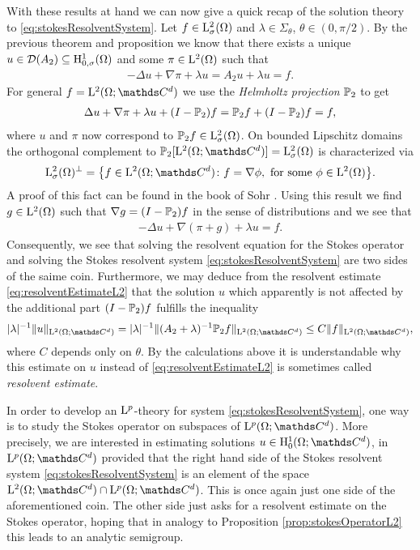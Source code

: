 With these results at hand we can now give a quick recap of the solution theory to \eqref{eq:stokesResolventSystem}.
Let $f \in \mathrm{L}^2_\sigma(\Omega)$ and $\lambda \in \Sigma_\theta$, $\theta \in (0, \pi/2)$.
By the previous theorem and proposition we know that there exists a unique $u \in \mathcal{D}(A_2) \subseteq \mathrm{H}^1_{0,\sigma}(\Omega)$ and some $\pi \in \mathrm{L}^2(\Omega)$ such that
\begin{align*}
  -\Delta u + \nabla \pi + \lambda u = A_2 u + \lambda u = f.
\end{align*}
For general $f = \Ell^2(\Omega; \C^d)$ we use the \emph{Helmholtz projection} $\mathbb{P}_2$ to get
\begin{align*}
  \Delta u + \nabla \pi + \lambda u + (I - \mathbb{P}_2) f = \mathbb{P}_2 f + (I - \mathbb{P}_2) f = f,
\end{align*}
where $u$ and $\pi$ now correspond to $\mathbb{P}_2 f \in \mathrm{L}^2_\sigma(\Omega)$. On bounded Lipschitz domains the orthogonal complement to $\PP_2[\Ell^2(\Omega; \C^d)] = \Ell^2_\sigma(\Omega)$ is characterized via
\begin{align*}
  \Ell^2_\sigma(\Omega)^\perp = \big\{ f \in \Ell^2(\Omega; \C^d) \colon f = \nabla \phi, \text{ for some } \phi \in \Ell^2(\Omega) \big\}.
\end{align*}
A proof of this fact can be found in the book of Sohr \cite[Lemma 2.5.3]{sohr}.
Using this result we find $g \in \mathrm{L}^2(\Omega)$ such that $\nabla g = (I - \mathbb{P}_2)f$ in the sense of distributions and we see that
\begin{align*}
  -\Delta u + \nabla( \pi + g ) + \lambda u = f.
\end{align*}
Consequently, we see that solving the resolvent equation for the Stokes operator and solving the Stokes resolvent system \eqref{eq:stokesResolventSystem} are two sides of the saime coin.
Furthermore, we may deduce from the resolvent estimate \eqref{eq:resolventEstimateL2} that the solution $u$ which apparently is not affected by the additional part $(I-\mathbb{P}_2)f$ fulfills the inequality
\begin{align*}
  |\lambda|^{-1} \| u\|_{\Ell^2(\Omega; \C^d)} = |\lambda|^{-1} \|(A_2 + \lambda)^{-1} \PP_2 f \|_{\Ell^2(\Omega; \C^d)} \leq C \| f \|_{\Ell^2(\Omega; \C^d)},
\end{align*}
where $C$ depends only on $\theta$.
By the calculations above it is understandable why this estimate on $u$ instead of \eqref{eq:resolventEstimateL2} is sometimes called \emph{resolvent estimate}.

In order to develop an $\mathrm{L}^p$-theory for system \eqref{eq:stokesResolventSystem}, one way is to study the Stokes operator on subspaces of $\Ell^p(\Omega; \C^d)$.
More precisely, we are interested in estimating solutions $u \in \HH^1_0(\Omega; \C^d)$, in $\Ell^p(\Omega; \C^d)$ provided that the right hand side of the Stokes resolvent system \eqref{eq:stokesResolventSystem} is an element of the space $\Ell^2(\Omega; \C^d) \cap \Ell^p(\Omega; \C^d)$.
This is once again just one side of the aforementioned coin. 
The other side just asks for a resolvent estimate on the Stokes operator, hoping that in analogy to Proposition \ref{prop:stokesOperatorL2} this leads to an analytic semigroup.

